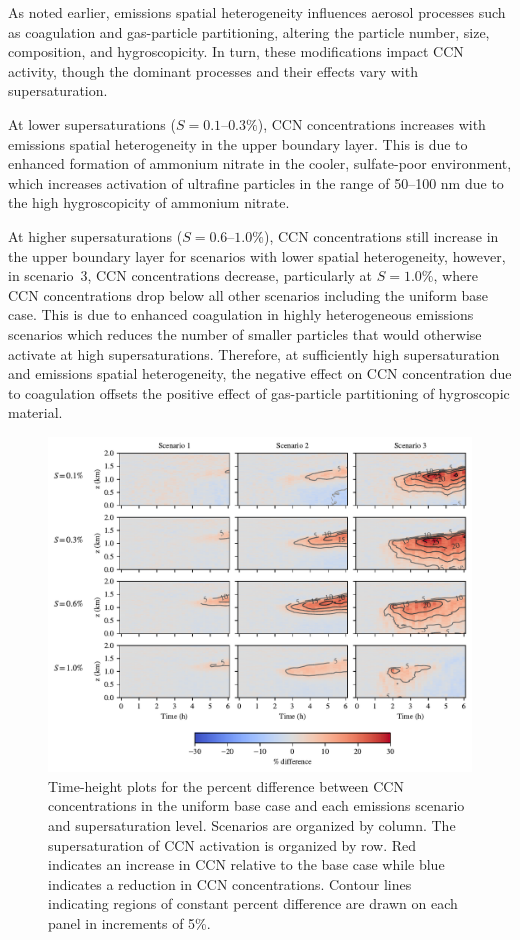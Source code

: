 \documentclass[journal abbreviation, manuscript]{copernicus}
\begin{document}
As noted earlier, emissions spatial heterogeneity influences aerosol
processes such as coagulation and gas-particle partitioning, altering
the particle number, size, composition, and hygroscopicity. In turn, these
modifications impact CCN activity, though the dominant
processes and their effects vary with supersaturation.

At lower supersaturations ($S=0.1\text{--}0.3\%$), CCN concentrations 
increases with emissions spatial heterogeneity
in the upper boundary layer. This is due to enhanced formation of
ammonium nitrate in the cooler, sulfate-poor environment, which
increases activation of ultrafine particles in the range of 50--100 nm
due to the high hygroscopicity of ammonium nitrate.

At higher supersaturations ($S=0.6\text{--}1.0\%$), CCN concentrations
still increase in the upper boundary layer for scenarios with lower
spatial heterogeneity, however, in scenario~3, CCN concentrations
decrease, particularly at $S=1.0\%$, where CCN concentrations drop
below all other scenarios including the uniform base case. This is due to 
enhanced coagulation in highly heterogeneous
emissions scenarios which reduces the number of smaller particles that would
otherwise activate at high supersaturations.  Therefore, at
sufficiently high supersaturation and emissions spatial heterogeneity,
the negative effect on CCN concentration due to coagulation offsets
the positive effect of gas-particle partitioning of hygroscopic
material.

\begin{figure}[!h]
	\centering
	\includegraphics[]{figures/height-time-ccn-pdiff-multi-scenario.pdf}
	\caption{Time-height plots for the percent difference between
          CCN concentrations in the uniform base case and each
          emissions scenario and supersaturation level. Scenarios are
          organized by column. The supersaturation of CCN activation
          is organized by row. Red indicates an increase in CCN
          relative to the base case while blue indicates a reduction
          in CCN concentrations. Contour lines indicating regions of
          constant percent difference are drawn on each panel in
          increments of 5\%.}
	\label{fig:time-height-ccn-pdiff}
\end{figure} 
\end{document}
